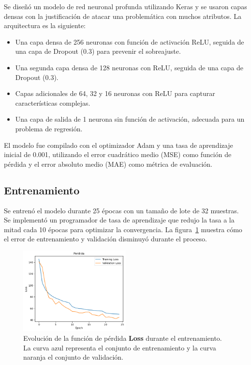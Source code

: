 \documentclass[conference]{IEEEtran} %
\begin{document}
Se diseñó un modelo de red neuronal profunda utilizando Keras y se usaron 
capas densas con la justificación de atacar una problemática con muchos 
atributos. La arquitectura es la siguiente:
\begin{itemize}
    \item Una capa densa de 256 neuronas con función de activación ReLU, 
    seguida de una capa de Dropout (0.3) para prevenir el sobreajuste.
    \item Una segunda capa densa de 128 neuronas con ReLU, seguida de una 
    capa de Dropout (0.3).
    \item Capas adicionales de 64, 32 y 16 neuronas con ReLU para capturar
    características complejas.
    \item Una capa de salida de 1 neurona sin función de activación, adecuada 
    para un problema de regresión.
\end{itemize}

El modelo fue compilado con el optimizador Adam y una tasa de 
aprendizaje inicial de 0.001, utilizando el error cuadrático medio 
(MSE) como función de pérdida y el error absoluto medio (MAE) como 
métrica de evaluación.

\subsection{Entrenamiento}

Se entrenó el modelo durante 25 épocas con un tamaño de lote de 
32 muestras. Se implementó un programador de tasa de aprendizaje 
que redujo la tasa a la mitad cada 10 épocas para optimizar la 
convergencia. La figura~\ref{fig:loss} muestra cómo el 
error de entrenamiento y validación disminuyó durante el proceso.

\begin{figure}[!h]
    \centering
    \includegraphics[width=0.5\textwidth]{Loss.png} %
    \caption{Evolución de la función de pérdida {\bf Loss} durante el entrenamiento. La curva azul representa el conjunto de entrenamiento y la curva naranja el conjunto de validación.}
    \label{fig:loss}
\end{figure}
\end{document}
